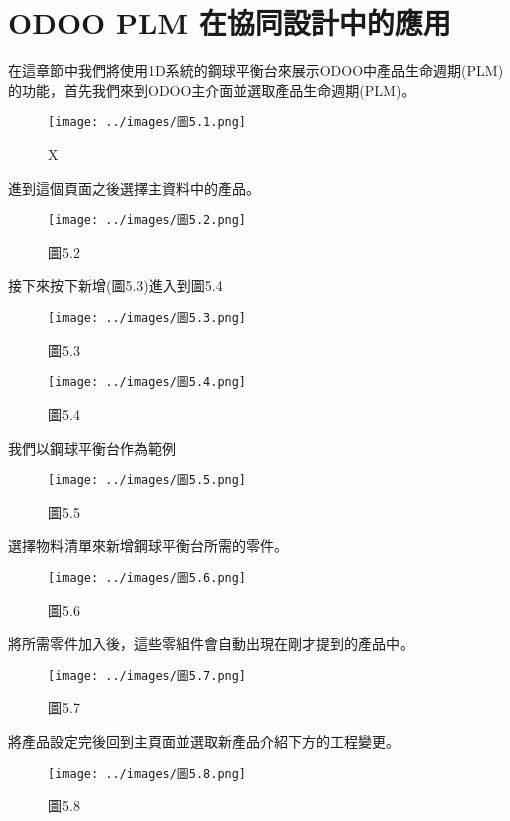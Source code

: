 \chapter{ODOO PLM 在協同設計中的應用}
在這章節中我們將使用1D系統的鋼球平衡台來展示ODOO中產品生命週期(PLM)的功能，首先我們來到ODOO主介面並選取產品生命週期(PLM)。

\begin{figure}[h]
\centering
\texttt{[image: ../images/圖5.1.png]}
\caption{X}
\end{figure}

進到這個頁面之後選擇主資料中的產品。

\begin{figure}[h]
\centering
\texttt{[image: ../images/圖5.2.png]}
\caption{圖5.2}
\end{figure}

接下來按下新增(圖5.3)進入到圖5.4

\begin{figure}[h]
\centering
\texttt{[image: ../images/圖5.3.png]}
\caption{圖5.3}
\end{figure}

\begin{figure}[h]
\centering
\texttt{[image: ../images/圖5.4.png]}
\caption{圖5.4}
\end{figure}

我們以鋼球平衡台作為範例

\begin{figure}[h]
\centering
\texttt{[image: ../images/圖5.5.png]}
\caption{圖5.5}
\end{figure}

選擇物料清單來新增鋼球平衡台所需的零件。

\begin{figure}[h]
\centering
\texttt{[image: ../images/圖5.6.png]}
\caption{圖5.6}
\end{figure}

將所需零件加入後，這些零組件會自動出現在剛才提到的產品中。

\begin{figure}[h]
\centering
\texttt{[image: ../images/圖5.7.png]}
\caption{圖5.7}
\end{figure}

將產品設定完後回到主頁面並選取新產品介紹下方的工程變更。

\begin{figure}[h]
\centering
\texttt{[image: ../images/圖5.8.png]}
\caption{圖5.8}
\end{figure}

